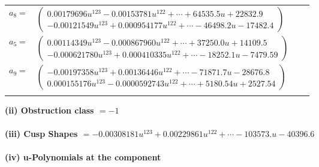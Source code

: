 \documentclass[1p]{elsarticle_modified}
\theoremstyle{definition}
\begin{document}
\begin{tabular}{m{7pt} m{180pt} m{7pt} m{180pt} }
\flushright $a_{8}=$&$\begin{pmatrix}0.00179696 u^{123}-0.00153781 u^{122}+\cdots+64535.5 u+22832.9\\-0.00121549 u^{123}+0.000954177 u^{122}+\cdots-46498.2 u-17482.4\end{pmatrix}$ \\
\flushright $a_{5}=$&$\begin{pmatrix}0.00114349 u^{123}-0.000867960 u^{122}+\cdots+37250.0 u+14109.5\\-0.000621780 u^{123}+0.000410335 u^{122}+\cdots-18252.1 u-7479.59\end{pmatrix}$ \\
\flushright $a_{9}=$&$\begin{pmatrix}-0.00197358 u^{123}+0.00136446 u^{122}+\cdots-71871.7 u-28676.8\\0.000155176 u^{123}-0.0000592743 u^{122}+\cdots+5180.54 u+2527.54\end{pmatrix}$\\&\end{tabular}
\flushleft \textbf{(ii) Obstruction class $= -1$}\\~\\
\flushleft \textbf{(iii) Cusp Shapes $= -0.00308181 u^{123}+0.00229861 u^{122}+\cdots-103573. u-40396.6$}\\~\\
\newpage\renewcommand{\arraystretch}{1}
\flushleft \textbf{(iv) u-Polynomials at the component}\newline \\
\end{document}
